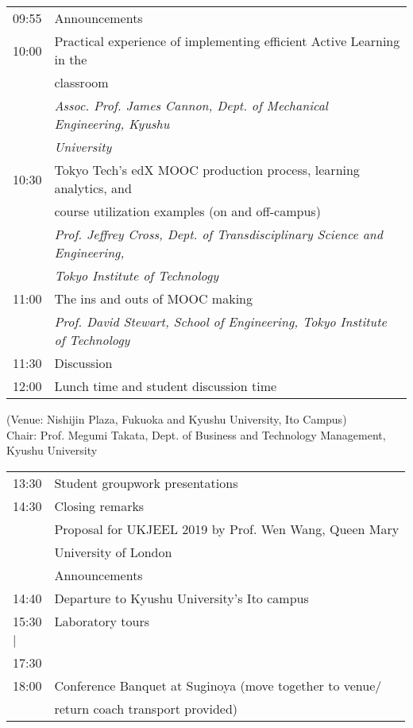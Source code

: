 \noindent\begin{tabular}{|l|l|}
    \hline
    09:55   & Announcements \\
    10:00   & Practical experience of implementing efficient Active Learning in the\\
            & classroom \\
            & \emph{Assoc. Prof. James Cannon, Dept. of Mechanical Engineering, Kyushu}\\
            & \emph{University} \\
    10:30   & Tokyo Tech’s edX MOOC production process, learning analytics, and\\
            & course utilization examples (on and off-campus) \\
            & \emph{Prof. Jeffrey Cross, Dept. of Transdisciplinary Science and Engineering,} \\
            & \emph{Tokyo Institute of Technology} \\
    11:00   & The ins and outs of MOOC making \\
            & \emph{Prof. David Stewart, School of Engineering, Tokyo Institute of Technology} \\
    11:30   & Discussion \\
    12:00   & Lunch time and student discussion time \\

    \hline
\end{tabular}

\newpage
\vspace*{3ex}
 (Venue: Nishijin Plaza, Fukuoka and Kyushu University, Ito Campus) \\
Chair: Prof. Megumi Takata, Dept. of Business and Technology Management, Kyushu University

\noindent\begin{tabular}{|l|l|}
    \hline
    13:30   & Student groupwork presentations \\
    14:30   & Closing remarks \\
            & Proposal for UKJEEL 2019 by Prof. Wen Wang, Queen Mary\\ 
            & University of London \\
            & Announcements \\
    14:40   & Departure to Kyushu University's Ito campus \\
    15:30   & Laboratory tours \\ %
    \hspace{1em}$\mid$  & \\
    17:30   & \\
    18:00   & Conference Banquet at Suginoya (move together to venue/ \\
            & \hspace{11em} return coach transport provided)\\
    \hline
\end{tabular}


